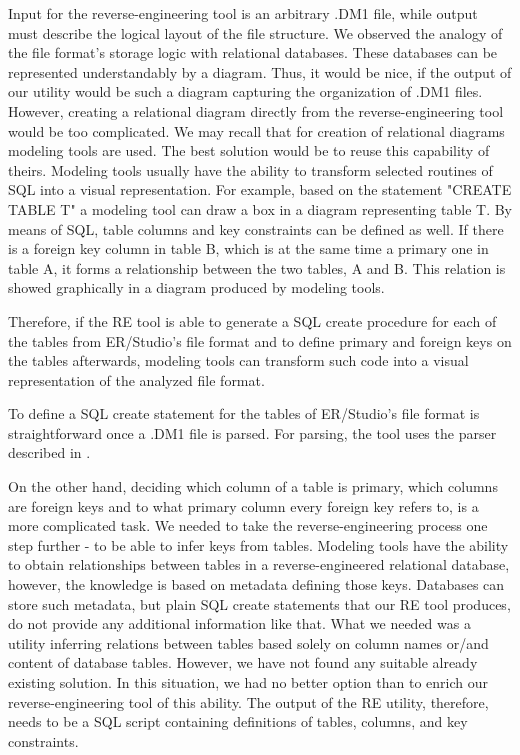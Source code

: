 Input for the reverse-engineering tool is an arbitrary .DM1 file, while output must describe the logical layout of the file structure.
We observed the analogy of the file format's storage logic with relational databases. 
These databases can be represented understandably by a diagram.
Thus, it would be nice, if the output of our utility would be such a diagram capturing the organization of .DM1 files.
However, creating a relational diagram directly from the reverse-engineering tool would be too complicated. We may recall that for creation of relational diagrams modeling tools are used. The best solution would be to reuse this capability of theirs.
Modeling tools usually have the ability to transform selected routines of SQL into a visual representation.
For example, based on the statement "CREATE TABLE T" a modeling tool can draw a box in a diagram representing table T. 
By means of SQL, table columns and key constraints can be defined as well.
If there is a foreign key column in table B, which is at the same time a primary one in table A, it forms a relationship between the two tables, A and B. This relation is showed graphically in a diagram produced by modeling tools.

Therefore, if the RE tool is able to generate a SQL create procedure for each of the tables from ER/Studio's file format and to define primary and foreign keys on the tables afterwards, modeling tools can transform such code into a visual representation of the analyzed file format.

To define a SQL create statement for the tables of ER/Studio's file format is straightforward once a .DM1 file is parsed. For parsing, the tool uses the parser described in .

On the other hand, deciding which column of a table is primary, which columns are foreign keys and to what primary column every foreign key refers to, is a more complicated task.
We needed to take the reverse-engineering process one step further - to be able to infer keys from tables.
Modeling tools have the ability to obtain relationships between tables in a reverse-engineered relational database, however, the knowledge is based on metadata defining those keys. Databases can store such metadata, but plain SQL create statements that our RE tool produces, do not provide any additional information like that.
What we needed was a utility inferring relations between tables based solely on column names or/and content of database tables. However, we have not found any suitable already existing solution.
In this situation, we had no better option than to enrich our reverse-engineering tool of this ability.
The output of the RE utility, therefore, needs to be a SQL script containing definitions of tables, columns, and key constraints.

